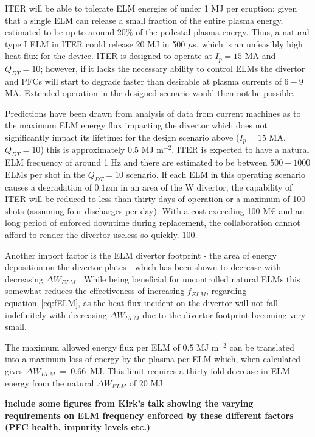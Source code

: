 \documentclass[12pt]{article}  %
\begin{document}
ITER will be able to tolerate ELM energies of under 1 MJ per eruption; given that a single ELM can release a small fraction of the entire plasma energy, estimated to be up to around $20\%$ of the pedestal plasma energy\cite{Loarte2003}. Thus, a natural type I ELM in ITER could release 20 MJ in 500 $\mu$s\cite{KirkFF}, which is an unfeasibly high heat flux for the device. ITER is designed to operate at $I_p = 15$ MA and $Q_{DT} = 10$; however, if it lacks the necessary ability to control ELMs the divertor and PFCs will start to degrade faster than desirable at plasma currents of $6-9$ MA.\cite{Lang2013} Extended operation in the designed scenario would then not be possible.

Predictions have been drawn from analysis of data from current machines as to the maximum ELM energy flux impacting the divertor which does not significantly impact its lifetime: for the design scenario above ($I_p = 15$ MA, $Q_{DT} = 10$) this is approximately $0.5$ MJ m$^{-2}$\cite{LoarteTR2013}. ITER is expected to have a natural ELM frequency of around 1 Hz\cite{KirkFF} and there are estimated to be between $500-1000$ ELMs per shot in the $Q_{DT}=10$ scenario. If each ELM in this operating scenario causes a degradation of $0.1 \mu$m in an area of the W divertor, the capability of ITER will be reduced to less than thirty days of operation or a maximum of 100 shots\cite{Lang2013} (assuming four discharges per day). With a cost exceeding 100 M€ \cite{Tsitrone2013} and an long period of enforced downtime during replacement, the collaboration cannot afford to render the divertor useless so quickly. $100$.

Another import factor is the ELM divertor footprint - the area of energy deposition on the divertor plates - which has been shown to decrease with decreasing $\Delta W_{ELM}$ \cite{Eich2011}. While being beneficial for uncontrolled natural ELMs this somewhat reduces the effectiveness of increasing $f_{ELM}$, regarding equation~\ref{eq:fELM}, as the heat flux incident on the divertor will not fall indefinitely with decreasing $\Delta W_{ELM}$ due to the divertor footprint becoming very small.

The maximum allowed energy flux per ELM of $0.5$ MJ m$^{-2}$ can be translated into a maximum loss of energy by the plasma per ELM which, when calculated gives $\Delta W_{ELM}~=~0.66$~MJ\cite{Loarte2010conf}. This limit requires a thirty fold decrease in ELM energy from the natural $\Delta W_{ELM}$ of 20 MJ. 

\textbf{include some figures from Kirk's talk showing the varying requirements on ELM frequency enforced by these different factors (PFC health, impurity levels etc.)}
\end{document}
